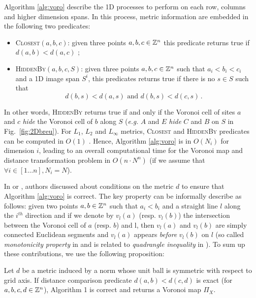 \documentclass{llncs}
\begin{document}
Algorithm \ref{alg:voro} describe the 1D processes to perform on each
row, columns and higher dimension spans. In this process, metric
information are embedded in the following two predicates:
\begin{itemize}
  \item \textsc{Closest}$(a, b, c)$: given three points $a,b,c\in{\mathbb{Z}}^n$
    this predicate returns true if $d(a,b) < d(a,c)$ ;
  \item \textsc{HiddenBy}$(a, b, c, S)$: given three points
    $a,b,c\in{\mathbb{Z}}^n$ such that $a_i<b_i<c_i$ and a 1D image span $S^i$, this predicates returns
    true if there is no  $s\in S$ such that
    \begin{equation}
      d(b,s) < d(a,s)\text{ and }  d(b,s) < d(c,s)\,.
    \end{equation}
\end{itemize}
In other words, \textsc{HiddenBy} returns true if and only if the
Voronoi cell of sites $a$ and $c$ \emph{hide} the Voronoi cell of $b$
along $S$ (\emph{e.g.} $A$ and $E$ \emph{hide} $C$ and $B$ on $S$ in
Fig.~\ref{fig:2Dbreu}).  For $L_1$, $L_2$ and $L_\infty$ metrics,
\textsc{Closest} and \textsc{HiddenBy} predicates can be computed in
$O(1)$ \cite{Breu1995,Hirata1996,Meijster2000}. Hence, Algorithm
\ref{alg:voro} is in $O(N_i)$ for dimension $i$, leading to an overall
computational time for the Voronoi map and distance transformation
problem in $O(n\cdot N^n)$ (if we assume that $\forall i\in[1\ldots
  n], N_i=N$).

In \cite{Hirata1996} or \cite{maurer_pami}, authors discussed about
conditions on the metric $d$ to ensure that Algorithm \ref{alg:voro}
is correct. The key property can be informally describe as follows:
given two points $a,b\in{\mathbb{Z}}^n$ such that $a_i<b_i$ and a straight line
$l$ along the $i^{th}$ direction and if we denote by $v_l(a)$
(resp. $v_l(b)$) the intersection between the Voronoi cell of $a$
(resp. $b$) and l, then $v_l(a)$ and $v_l(b)$ are simply connected
Euclidean segments and $v_l(a)$ appears \emph{before} $v_l(b)$ on $l$
(so called \emph{monotonicity property} in \cite{Maurer2003} and is
related to \emph{quadrangle inequality} in \cite{Hirata1996}).  To sum
up these contributions, we use the following proposition:
\begin{proposition}
\label{prop:voronoi-map-from-1}
  Let $d$ be a metric induced by a norm whose unit ball is symmetric
  with respect to grid axis. If distance comparison predicate
  $d(a,b)<d(c,d)$ is exact (for $a,b,c,d\in{\mathbb{Z}}^n$), Algorithm 1 is
  correct and returns a Voronoi map $\Pi_X$.
\end{proposition}
\end{document}
